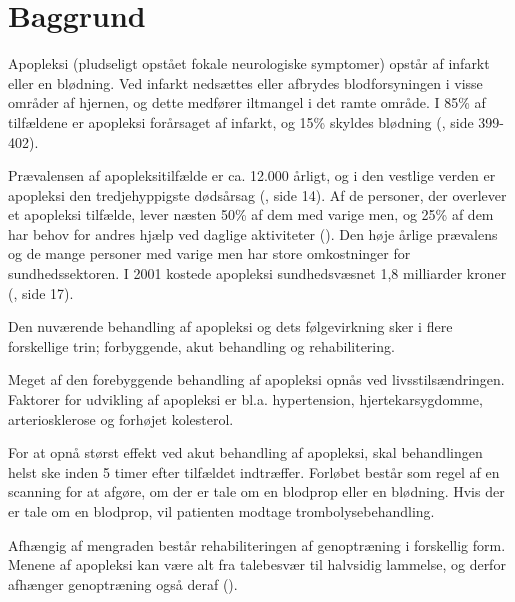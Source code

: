 \chapter{Baggrund} \label{chap:Baggrund}

Apopleksi (pludseligt opstået fokale neurologiske symptomer) opstår af infarkt eller en blødning. Ved infarkt nedsættes eller afbrydes blodforsyningen i visse områder af hjernen, og dette medfører iltmangel i det ramte område. I 85\% af tilfældene er apopleksi forårsaget af infarkt, og 15\% skyldes blødning (\cite{RefWorks:32}, side 399-402).

Prævalensen af apopleksitilfælde er ca. 12.000 årligt, og i den vestlige verden er apopleksi den tredjehyppigste dødsårsag (\cite{RefWorks:21}, side 14). Af de personer, der overlever et apopleksi tilfælde, lever næsten 50\% af dem med varige men, og 25\% af dem har behov for andres hjælp ved daglige aktiviteter (\cite{RefWorks:33}). Den høje årlige prævalens og de mange personer med varige men har store omkostninger for sundhedssektoren.  I 2001 kostede apopleksi sundhedsvæsnet 1,8 milliarder kroner (\cite{RefWorks:37}, side 17). 

Den nuværende behandling af apopleksi og dets følgevirkning sker i flere forskellige trin; forbyggende, akut behandling og rehabilitering. 

Meget af den forebyggende behandling af apopleksi opnås ved livsstilsændringen. Faktorer for udvikling af apopleksi er bl.a. hypertension, hjertekarsygdomme, arteriosklerose og forhøjet kolesterol. 

For at opnå størst effekt ved akut behandling af apopleksi, skal behandlingen helst ske inden 5 timer efter tilfældet indtræffer. Forløbet består som regel af en scanning for at afgøre, om der er tale om en blodprop eller en blødning. Hvis der er tale om en blodprop, vil patienten modtage trombolysebehandling.

Afhængig af mengraden består rehabiliteringen af genoptræning i forskellig form. Menene af apopleksi kan være alt fra talebesvær til halvsidig lammelse, og derfor afhænger genoptræning også deraf (\cite{RefWorks:34}).

